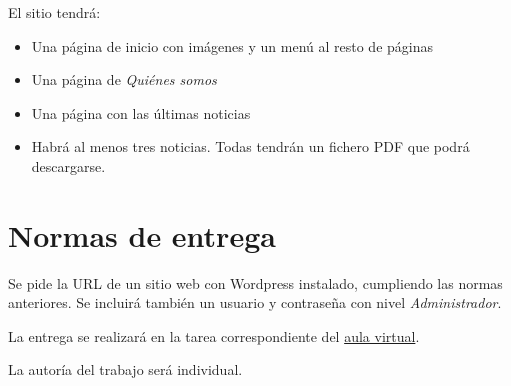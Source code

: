 \documentclass[a4paper]{article}
\begin{document}
El sitio tendrá:
\begin{itemize}
\item Una página de inicio con imágenes y un menú al resto de páginas
\item Una página de \emph{Quiénes somos}
\item Una página con las últimas noticias
\item Habrá al menos tres noticias. Todas tendrán un fichero PDF que podrá descargarse.
\end{itemize}

\section{Normas de entrega}
\label{sec:org000000c}
Se pide la URL de un sitio web con Wordpress instalado, cumpliendo las normas anteriores. Se incluirá también un usuario y contraseña con nivel \emph{Administrador}.

La entrega se realizará en la tarea correspondiente del \href{https://aulavirtual3.educa.madrid.org/ies.alonsodeavellan.alcala/}{aula virtual}.

La autoría del trabajo será individual.
\end{document}
